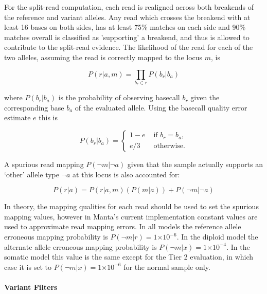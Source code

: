 \documentclass{article}
\newcommand{\e}[1]{\ensuremath{\times 10^{#1}}}
\begin{document}
For the split-read computation, each read is realigned across both breakends of the reference and variant alleles. Any read which crosses the breakend with at least 16 bases on both sides, has at least 75\% matches on each side and 90\% matches overall is classified as 'supporting' a breakend, and thus is allowed to contribute to the split-read evidence. The likelihood of the read for each of the two alleles, assuming the read is correctly mapped to the locus $m$, is

\begin{equation*}
P (r \vert a,m) = \prod_{b_r \in r} P(b_r \vert b_a)
\end{equation*}

\noindent
where $P(b_r \vert b_a)$ is the probability of observing basecall $b_r$ given the corresponding base $b_a$ of the evaluated allele. Using the basecall quality error estimate $e$ this is

\begin{equation*} 
P(b_r \vert b_a) =
\left\{
\begin{array}{rl}
1-e & \mbox{ if $b_r=b_a$,} \\
e/3 & \mbox{ otherwise.}
\end{array}
\right.
\end{equation*}

A spurious read mapping $P(\neg m \vert \neg a)$ given that the sample actually supports an `other' allele type $\neg a$ at this locus is also accounted for:

\begin{equation*}
P ( r \vert a) = P ( r \vert a,m ) (P(m \vert a))  + P (\neg m \vert \neg a)
\end{equation*}

In theory, the mapping qualities for each read should be used to set the spurious mapping values, however in Manta's current implementation constant values are used to approximate read mapping errors.  In all models the reference allele erroneous mapping probability is $P(\neg m \vert r) =  1\e{-6}$. In the diploid model the alternate allele erroneous mapping probability is $P(\neg m \vert x) =  1\e{-4}$. In the somatic model this value is the same except for the Tier 2 evaluation, in which case it is set to $P(\neg m \vert x) =  1\e{-6}$ for the normal sample only.

\paragraph{Variant Filters}
\end{document}
